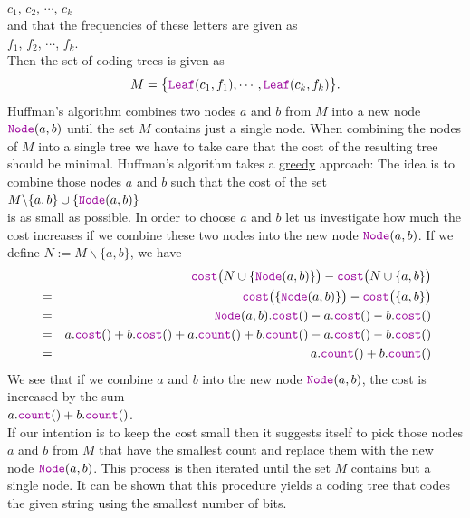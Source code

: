 \\[0.2cm]
\hspace*{1.3cm}
$c_1$, $c_2$, $\cdots$, $c_k$
\\[0.2cm]
and that the frequencies of these letters are given as
\\[0.2cm]
\hspace*{1.3cm}
$f_1$, $f_2$, $\cdots$, $f_k$.
\\[0.2cm]
Then the set of coding trees is given as
\begin{equation}
  \label{eq:huffmann1}
 M = \bigl\{  \mytt{Leaf}(c_1, f_1), \cdots, \mytt{Leaf}(c_k, f_k) \bigr\}.   
\end{equation}
Huffman's algorithm combines two nodes $a$ and $b$ from $M$ into a new node
$\mytt{Node}(a,b)$ until the set $M$ contains just a single node.  When combining the nodes of $M$ into a single
tree we have to take care that the cost of the resulting tree should be minimal.
Huffman's algorithm takes a \href{https://en.wikipedia.org/wiki/Greedy_algorithm}{greedy} approach: 
The idea is to combine those nodes $a$ and $b$ such that the cost of the set
\\[0.2cm]
\hspace*{1.3cm}
$M \backslash \{a,b\} \cup \{ \mytt{Node}(a,b) \}$
\\[0.2cm]
is as small as possible.
In order to choose $a$ and $b$ let us investigate how much the cost increases if we combine these two nodes
into the new node $\mytt{Node}(a,b)$.  If we define $N := M \backslash \{a,b\}$, we have
\begin{eqnarray*}
& & \mytt{cost}\bigl(N \cup \{ \mytt{Node}(a,b) \}\bigr) - \mytt{cost}\bigl(N \cup \{ a,b \}\bigr) \\
&=& \mytt{cost}\bigl( \{ \mytt{Node}(a,b) \}\bigr) - \mytt{cost}\bigl(\{ a,b \}\bigr)              \\
&=& \mytt{Node}(a,b).\mytt{cost}() - a.\mytt{cost}() - b.\mytt{cost}()                           \\
&=&   a.\mytt{cost}() + b.\mytt{cost}() + a.\mytt{count}() + b.\mytt{count}() 
    - a.\mytt{cost}() - b.\mytt{cost}()                                                              \\
&=& a.\mytt{count}() + b.\mytt{count}() 
\end{eqnarray*}
We see that if we combine $a$ and $b$ into the new node $\mytt{Node}(a,b)$, the cost is increased by the sum 
\\[0.2cm]
\hspace*{1.3cm}
$a.\mytt{count}() + b.\mytt{count}()$. 
\\[0.2cm]
If our intention is to keep the cost small then it suggests itself to pick those nodes
$a$ and $b$ from $M$ that have the smallest count and replace them with the new node
$\mytt{Node}(a,b)$.  This process is then iterated until the set $M$ contains but a single node.
It can be shown that this procedure yields a coding tree that codes the given string using the smallest number
of bits. 

